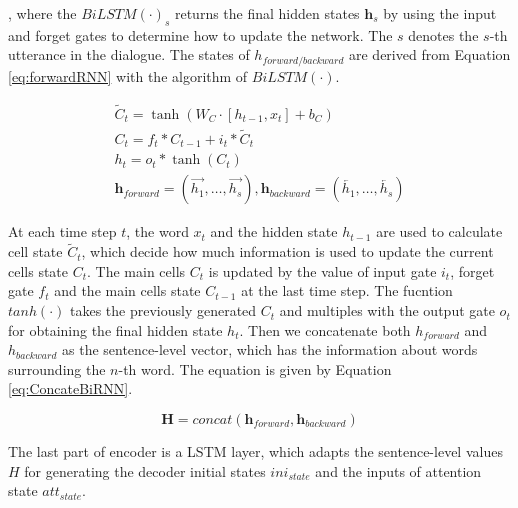 {{, where the $BiLSTM\left(\cdot\right)_{s}$ returns the final hidden states $\mathbf{h}_{s}$ by using the input and forget gates to determine how to update the network. The $s$ denotes the $s$-th utterance in the dialogue.  The states of $h_{forward/backward}$ are derived from Equation \ref{eq:forwardRNN} with the algorithm of $BiLSTM\left(\cdot\right)$.

\begin{equation} \label{eq:forwardRNN}
\begin{array}{l}
\tilde{C}_{t}=\tanh \left(W_{C} \cdot\left[h_{t-1}, x_{t}\right]+b_{C}\right)\\
C_{t}=f_{t} * C_{t-1}+i_{t} * \tilde{C}_{t}\\
h_{t}=o_{t} * \tanh \left(C_{t}\right)\\
\mathbf{h}_{forward} = \left(\overrightarrow{h_{1}}, \ldots,\overrightarrow{h_{s}}\right) ,
\mathbf{h}_{backward} = \left(\overleftarrow{h_{1}}, \ldots,\overleftarrow{h_{s}}\right)
\end{array}
\end{equation}

At each time step $t$, the word $x_{t}$ and the hidden state $h_{t-1}$ are used to calculate cell state $\tilde{C}_{t}$, which decide how much information is used to update the current cells state $C_{t}$. The main cells $C_{t}$ is updated by the value of input gate $i_{t}$, forget gate $f_{t}$ and the main cells state $C_{t-1}$ at the last time step. The fucntion $tanh\left(\cdot\right)$ takes the previously generated $C_{t}$ and multiples with the output gate $o_{t}$ for obtaining the final hidden state $h_{t}$. Then we concatenate both $h_{forward}$ and $h_{backward}$  as the sentence-level vector, which has the information about words surrounding the $n$-th word. The equation is given by Equation \ref{eq:ConcateBiRNN}.

\begin{equation} \label{eq:ConcateBiRNN}
    \mathbf{H} = concat\left(\mathbf{h}_{forward}, \mathbf{h}_{backward}\right)
\end{equation}


The last part of encoder is a LSTM layer, which adapts the sentence-level values $H$ for generating the decoder initial states $ini_{state}$ and the inputs of attention state $att_{state}$. 

}}
